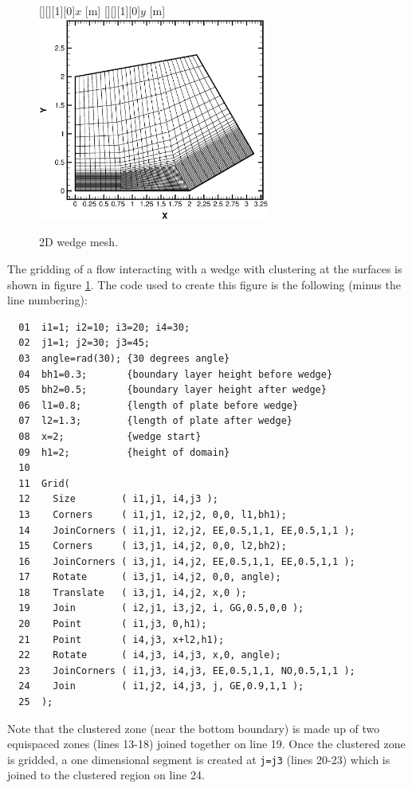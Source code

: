 \documentclass{warpdoc}
\newcommand{\fontxfig}{\footnotesize\scalefont{0.918}}
\begin{document}
%
\begin{figure}[h]
\vspace{0.3cm}
   \fontxfig
   [][][1][0]{$x$ [m]}
   [][][1][0]{$y$ [m]}
   \includegraphics[width=3.0in]{grid.2D.wedge.eps}
\caption{2D wedge mesh.}
\label{fig:gridwedge}
\end{figure}
%
The gridding of a flow interacting with a wedge with clustering at the surfaces is shown in figure \ref{fig:gridwedge}. The code used
to create this figure is the following (minus the line numbering):
%
\begin{verbatim}
  01  i1=1; i2=10; i3=20; i4=30;
  02  j1=1; j2=30; j3=45;
  03  angle=rad(30); {30 degrees angle}
  04  bh1=0.3;       {boundary layer height before wedge}
  05  bh2=0.5;       {boundary layer height after wedge}
  06  l1=0.8;        {length of plate before wedge}
  07  l2=1.3;        {length of plate after wedge}
  08  x=2;           {wedge start}
  09  h1=2;          {height of domain}
  10
  11  Grid(
  12    Size        ( i1,j1, i4,j3 );
  13    Corners     ( i1,j1, i2,j2, 0,0, l1,bh1);
  14    JoinCorners ( i1,j1, i2,j2, EE,0.5,1,1, EE,0.5,1,1 );
  15    Corners     ( i3,j1, i4,j2, 0,0, l2,bh2);
  16    JoinCorners ( i3,j1, i4,j2, EE,0.5,1,1, EE,0.5,1,1 );
  17    Rotate      ( i3,j1, i4,j2, 0,0, angle);
  18    Translate   ( i3,j1, i4,j2, x,0 );
  19    Join        ( i2,j1, i3,j2, i, GG,0.5,0,0 );
  20    Point       ( i1,j3, 0,h1);
  21    Point       ( i4,j3, x+l2,h1);
  22    Rotate      ( i4,j3, i4,j3, x,0, angle);
  23    JoinCorners ( i1,j3, i4,j3, EE,0.5,1,1, NO,0.5,1,1 );
  24    Join        ( i1,j2, i4,j3, j, GE,0.9,1,1 );
  25  );
\end{verbatim}
%
Note that
the clustered zone (near the bottom boundary) is made up of
two equispaced zones (lines 13-18) joined together on line 19.
Once the clustered zone is gridded, a one dimensional segment
is created at \verb|j=j3| (lines 20-23) which is joined to the
clustered region on line 24.
\end{document}
